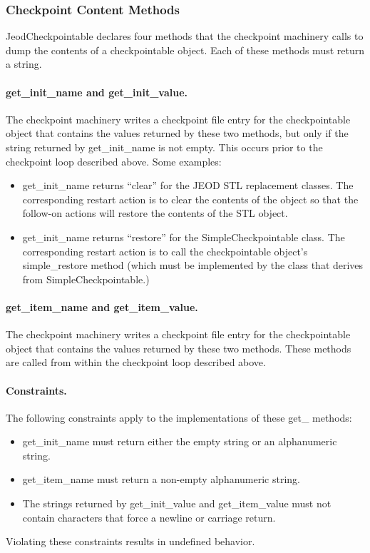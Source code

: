 \subsubsection{Checkpoint Content Methods}
JeodCheckpointable declares four methods that the checkpoint machinery
calls to dump the contents of a checkpointable object.
Each of these methods must return a string.
\paragraph{get\_init\_name and get\_init\_value.}
The checkpoint machinery writes a checkpoint file entry for the
checkpointable object that contains the values returned by these two methods,
but only if the string returned by get\_init\_name is not empty.
This occurs prior to the checkpoint loop described above.
Some examples:
\begin{itemize}
\item get\_init\_name returns ``clear'' for the JEOD STL replacement classes.
The corresponding restart action is to clear the contents of the
object so that the follow-on actions will restore the contents of the
STL object.
\item get\_init\_name returns ``restore'' for the SimpleCheckpointable class.
The corresponding restart action is to call the checkpointable object's
simple\_restore method (which must be implemented by the class that
derives from SimpleCheckpointable.)
\end{itemize}

\paragraph{get\_item\_name and get\_item\_value.}
The checkpoint machinery writes a checkpoint file entry for the
checkpointable object that contains the values returned by these two methods.
These methods are called from within the checkpoint loop described above.

\paragraph{Constraints.}
The following constraints apply to the implementations of these get\_ methods:
\begin{itemize}
\item get\_init\_name must return either the empty string or an
alphanumeric string.
\item get\_item\_name must return a non-empty alphanumeric string.
\item The strings returned by get\_init\_value and get\_item\_value must
not contain characters that force a newline or carriage return.
\end{itemize}
Violating these constraints results in undefined behavior.

